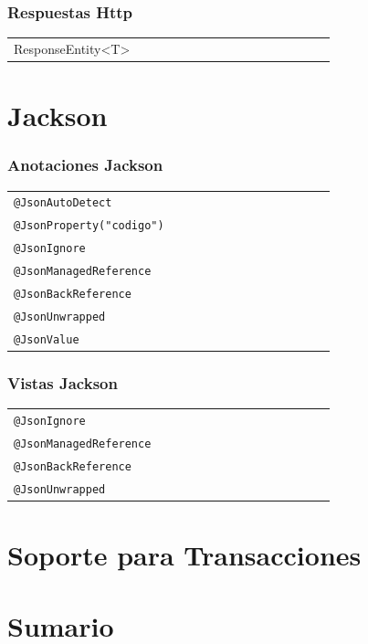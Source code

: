 \documentclass[handout,a4paper,slidestop,xcolor=pst,blue]{beamer}
\newcommand{\ann}[1]{\color{blue}\texttt{#1}\color{black}}
\begin{document}
\begin{frame}[c]
    \frametitle{Respuestas Http}
    \begin{tabular}{lp{0.70\linewidth}}
         ResponseEntity<T>  & \\
   \end{tabular}
\end{frame}

\section{Jackson}

\begin{frame}[c]
    \frametitle{Anotaciones Jackson}
    \begin{tabular}{lp{0.70\linewidth}}
        \ann{@JsonAutoDetect} & \\
        \ann{@JsonProperty("codigo")} & \\
        \ann{@JsonIgnore}        &  \\
        \ann{@JsonManagedReference} &  \\
        \ann{@JsonBackReference} &  \\
        \ann{@JsonUnwrapped} & \\
        \ann{@JsonValue} & \\
    \end{tabular}
\end{frame}

\begin{frame}[c]
    \frametitle{Vistas Jackson}
    \begin{tabular}{lp{0.70\linewidth}}
        \ann{@JsonIgnore}        &  \\
        \ann{@JsonManagedReference} &  \\
        \ann{@JsonBackReference} &  \\
        \ann{@JsonUnwrapped} & \\
    \end{tabular}
\end{frame}

\section{Soporte para Transacciones}


\section{Sumario}
\end{document}
